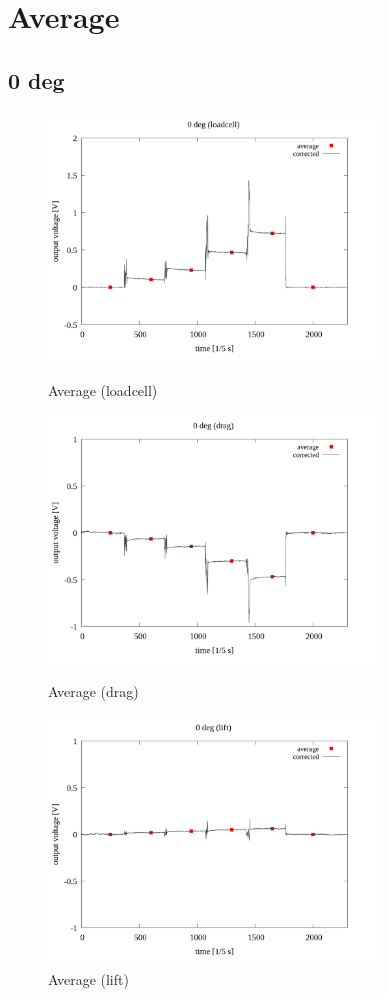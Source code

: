\documentclass[twocolumn,a4j]{jsarticle}
\begin{document}
\newpage
\section{Average}
\subsection{0 deg}
\begin{figure}[htbp]
    \footnotesize
    \begin{center}
        \includegraphics[width=88mm]{../images/average/0_loadcell_average.png}
        \caption{Average (loadcell)}
        \includegraphics[width=88mm]{../images/average/0_drag_average.png}
        \caption{Average (drag)}
        \includegraphics[width=88mm]{../images/average/0_lift_average.png}
        \caption{Average (lift)}
    \end{center}
\end{figure}
\end{document}
